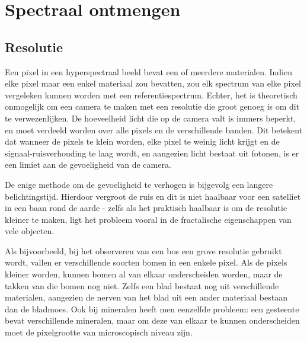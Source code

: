 \documentclass[12pt]{report}
\begin{document}
\chapter{Spectraal ontmengen}




\section{Resolutie}

Een pixel in een hyperspectraal beeld bevat een of meerdere materialen. Indien elke pixel maar een enkel materiaal zou bevatten, zou elk spectrum van elke pixel vergeleken kunnen worden met een referentiespectrum. Echter, het is theoretisch onmogelijk om een camera te maken met een resolutie die groot genoeg is om dit te verwezenlijken. De hoeveelheid licht die op de camera valt is immers beperkt, en moet verdeeld worden over alle pixels en de verschillende banden. Dit betekent dat wanneer de pixels te klein worden, elke pixel te weinig licht krijgt en de signaal-ruisverhouding te laag wordt, en aangezien licht bestaat uit fotonen, is er een limiet aan de gevoeligheid van de camera. 

De enige methode om de gevoeligheid te verhogen is bijgevolg een langere belichtingstijd. Hierdoor vergroot de ruis en dit is niet haalbaar voor een satelliet in een baan rond de aarde - zelfs als het praktisch haalbaar is om de resolutie kleiner te maken, ligt het probleem vooral in de fractalische eigenschappen van vele objecten. 

Als bijvoorbeeld, bij het observeren van een bos een grove resolutie gebruikt wordt, vallen er verschillende soorten bomen in een enkele pixel. Als de pixels kleiner worden, kunnen bomen al van elkaar onderscheiden worden, maar de takken van die bomen nog niet. Zelfs een blad bestaat nog uit verschillende materialen, aangezien de nerven van het blad uit een ander materiaal bestaan dan de bladmoes. Ook bij mineralen heeft men eenzelfde probleem: een gesteente bevat verschillende mineralen, maar om deze van elkaar te kunnen onderscheiden moet de pixelgrootte van microscopisch niveau zijn. 
\end{document}
